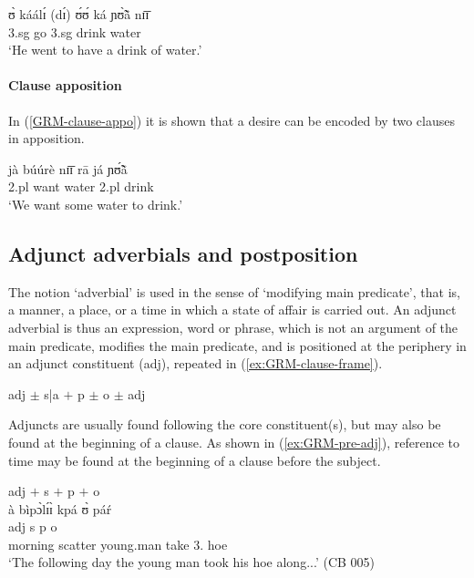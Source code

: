 \begin{exe}
\begin{exe}
 \ex\label{GRM-clause-comp-2-pur}
 \gll ʊ̀ káálɪ́ (dɪ́) ʊ́ʊ́ ká ɲʊ̃̀ã̀ nɪ̄ɪ̄   \\
{\sc 3.sg} go   {\comp}  {\sc 3.sg}   {\egr} drink  water  \\
 \glt  `He went to have a drink of water.' 


  \z 
 \z






 \paragraph{Clause apposition}
 \label{GRM-dep-comp-clause}
% 
In (\ref{GRM-clause-appo}) it is shown that a desire can be
encoded by two clauses in apposition. 
% 
 \begin{exe}
 \ex\label{GRM-clause-appo}
 \gll jà búúrè nɪ̄ɪ̄ rā já ɲʊ̃́ã̀\\
{\sc 2.pl} want water {\foc} {\sc 2.pl} drink\\
 \glt  `We want some water to drink.' 
 \z


 
 
\subsection{Adjunct adverbials and postposition}
\label{sec:GRM-adjuncts}


The notion `adverbial' is used in the sense of  `modifying main predicate', 
that 
is,  a manner, a place, or a time in which a state of affair is carried out. An 
adjunct adverbial is thus an expression, word or phrase, which is not an 
argument of  the main predicate, modifies the main predicate, and is positioned 
at the periphery 
in 
an adjunct constituent  ({\sc adj}), repeated in  (\ref{ex:GRM-clause-frame}). 

\begin{exe}
 {\sc adj}  $\pm$ {\sc s|a}  $+$ {\sc p} $\pm$ {\sc o} $\pm$ {\sc adj} 
\end{exe}



Adjuncts are usually found following the core constituent(s), but may also be
found at the beginning of a clause. As
shown in (\ref{ex:GRM-pre-adj}), 
reference to time may be found at the beginning of a clause before 
the 
subject.


\ea\label{ex:GRM-pre-adj}
{{\sc adj} $+$ {\sc s}  $+$ {\sc p}  $+$  {\sc o}}\\
\glll  {[tʃʊ̀ɔ̀sá  pɪ̀sɪ̀]}   {à    bìpɔ̀lɪ́ɪ̀}  kpá {ʊ̀ páŕ}\\ 
 {\sc adj}  {\sc s}  {\sc p} {\sc o}\\
{morning   scatter}   {{\art} young.man} take {{3\sg.\poss} hoe}\\
  \glt  `The following day the young man took his hoe along...' (CB 005)
\z


\end{exe}
\end{exe}
\end{exe}
